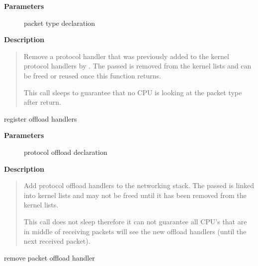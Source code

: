 \documentclass[a4paper,8pt,english]{sphinxmanual}
\begin{document}
\textbf{Parameters}
\begin{description}
\item[{}] \leavevmode
packet type declaration

\end{description}

\textbf{Description}
\begin{quote}

Remove a protocol handler that was previously added to the kernel
protocol handlers by {\hyperref[networking/kapi:c.dev_add_pack]{\emph{}}}. The passed  is removed
from the kernel lists and can be freed or reused once this function
returns.

This call sleeps to guarantee that no CPU is looking at the packet
type after return.
\end{quote}

\begin{fulllineitems}
\label{networking/kapi:c.dev_add_offload}
register offload handlers

\end{fulllineitems}


\textbf{Parameters}
\begin{description}
\item[{}] \leavevmode
protocol offload declaration

\end{description}

\textbf{Description}
\begin{quote}

Add protocol offload handlers to the networking stack. The passed
 is linked into kernel lists and may not be freed until
it has been removed from the kernel lists.

This call does not sleep therefore it can not
guarantee all CPU's that are in middle of receiving packets
will see the new offload handlers (until the next received packet).
\end{quote}

\begin{fulllineitems}
\label{networking/kapi:c.dev_remove_offload}
remove packet offload handler

\end{fulllineitems}
\end{document}
